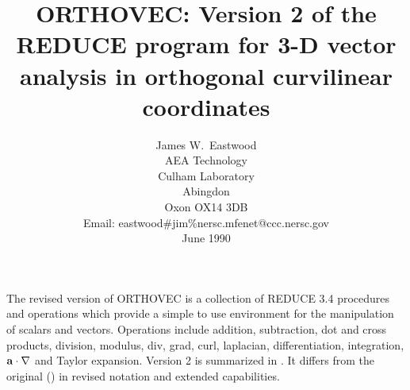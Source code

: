 \title{ORTHOVEC: Version 2 of the REDUCE program
for 3-D vector analysis in orthogonal curvilinear coordinates}
\date{}
\author{James W.~Eastwood \\ AEA Technology \\ Culham Laboratory \\
Abingdon \\ Oxon OX14 3DB \\[0.1in]
Email: eastwood\#jim\%nersc.mfenet@ccc.nersc.gov \\[0.1in] June 1990}

\maketitle
{}

The revised version of ORTHOVEC is a collection of REDUCE 3.4 procedures and
operations which provide a simple to use environment for the manipulation of
scalars and vectors.  Operations include addition, subtraction, dot and cross
products, division, modulus, div, grad, curl, laplacian, differentiation,
integration, ${\bf a \cdot \nabla}$ and Taylor expansion.  Version 2 is
summarized in \cite{Eastwood:91}.  It differs from the original (\cite
{Eastwood:87}) in revised notation and extended capabilities.

